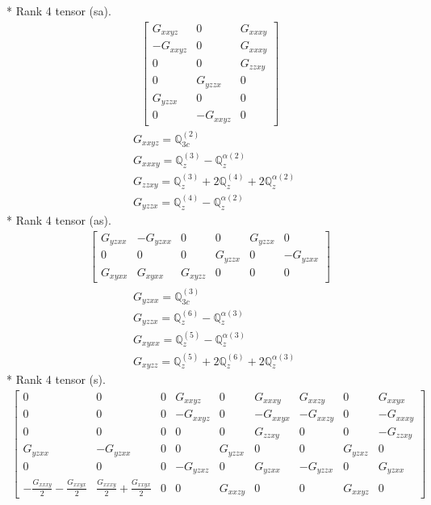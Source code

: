 \documentclass[fleqn,8pt,landscape]{jsarticle}
\begin{document}
* Rank 4 tensor (sa).
\begin{align*}
\begin{bmatrix} G_{xxyz} & 0 & G_{xxxy} \\ - G_{xxyz} & 0 & G_{xxxy} \\ 0 & 0 & G_{zzxy} \\ 0 & G_{yzzx} & 0 \\ G_{yzzx} & 0 & 0 \\ 0 & - G_{xxyz} & 0 \end{bmatrix}
\end{align*}
\begin{align*}
& G_{xxyz} = \mathbb{Q}_{3c}^{(2)} \\
& G_{xxxy} = \mathbb{Q}_{z}^{(3)} - \mathbb{Q}_{z}^{\alpha(2)} \\
& G_{zzxy} = \mathbb{Q}_{z}^{(3)} + 2 \mathbb{Q}_{z}^{(4)} + 2 \mathbb{Q}_{z}^{\alpha(2)} \\
& G_{yzzx} = \mathbb{Q}_{z}^{(4)} - \mathbb{Q}_{z}^{\alpha(2)}
\end{align*}
* Rank 4 tensor (as).
\begin{align*}
\begin{bmatrix} G_{yzxx} & - G_{yzxx} & 0 & 0 & G_{yzzx} & 0 \\ 0 & 0 & 0 & G_{yzzx} & 0 & - G_{yzxx} \\ G_{xyxx} & G_{xyxx} & G_{xyzz} & 0 & 0 & 0 \end{bmatrix}
\end{align*}
\begin{align*}
& G_{yzxx} = \mathbb{Q}_{3c}^{(3)} \\
& G_{yzzx} = \mathbb{Q}_{z}^{(6)} - \mathbb{Q}_{z}^{\alpha(3)} \\
& G_{xyxx} = \mathbb{Q}_{z}^{(5)} - \mathbb{Q}_{z}^{\alpha(3)} \\
& G_{xyzz} = \mathbb{Q}_{z}^{(5)} + 2 \mathbb{Q}_{z}^{(6)} + 2 \mathbb{Q}_{z}^{\alpha(3)}
\end{align*}
* Rank 4 tensor (s).
\begin{align*}
\begin{bmatrix} 0 & 0 & 0 & G_{xxyz} & 0 & G_{xxxy} & G_{xxzy} & 0 & G_{xxyx} \\ 0 & 0 & 0 & - G_{xxyz} & 0 & - G_{xxyx} & - G_{xxzy} & 0 & - G_{xxxy} \\ 0 & 0 & 0 & 0 & 0 & G_{zzxy} & 0 & 0 & - G_{zzxy} \\ G_{yzxx} & - G_{yzxx} & 0 & 0 & G_{yzzx} & 0 & 0 & G_{yzxz} & 0 \\ 0 & 0 & 0 & - G_{yzxz} & 0 & G_{yzxx} & - G_{yzzx} & 0 & G_{yzxx} \\ - \frac{G_{xxxy}}{2} - \frac{G_{xxyx}}{2} & \frac{G_{xxxy}}{2} + \frac{G_{xxyx}}{2} & 0 & 0 & G_{xxzy} & 0 & 0 & G_{xxyz} & 0 \end{bmatrix}
\end{align*}
\end{document}
